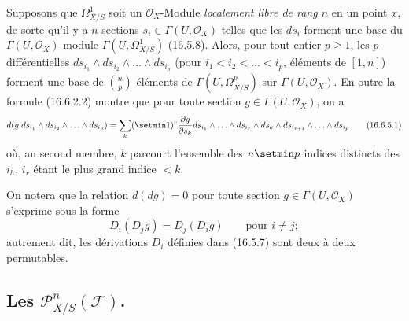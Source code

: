 \begin{env}[16.6.5]
\label{IV.16.6.5}
Supposons que $\boldsymbol{\varOmega}_{X/S}^1$ soit un $\mathcal{O}_X$-Module \emph{localement libre
de rang $n$} en un point $x$, de sorte qu'il y a $n$ sections
$s_i\in\Gamma(U,\mathcal{O}_X)$ telles que les $ds_i$ forment une base du
$\Gamma(U,\mathcal{O}_X)$-module $\Gamma(U,\varOmega_{X/S}^1)$ (16.5.8).
Alors, pour tout entier $p\geq1$, les $p$-différentielles
$ds_{i_1}\wedge ds_{i_2}\wedge\ldots\wedge ds_{i_p}$ (pour
$i_1<i_2<\ldots<i_p$, éléments de $[1,n]$) forment une base de
$\binom{n}{p}$ éléments de $\Gamma(U,\varOmega_{X/S}^p)$ sur
$\Gamma(U,\mathcal{O}_X)$. En outre la formule (16.6.2.2) montre que pour
toute section $g\in\Gamma(U,\mathcal{O}_X)$, on a
\[
  d(g.ds_{i_1}\wedge ds_{i_2}\wedge\ldots\wedge ds_{i_p})
  =\sum_k(\setmin 1)^r\frac{\partial g}{\partial s_k}
  ds_{i_1}\wedge\ldots\wedge ds_{i_r}\wedge ds_k\wedge
  ds_{i_{r+1}}\wedge\ldots\wedge ds_{i_p}
  \tag{16.6.5.1}
  \label{IV.16.6.5.1}
\]
où, au second membre, $k$ parcourt l'ensemble des $n\setmin p$ indices distincts des
$i_h$, $i_r$ étant le plus grand indice $<k$.

On notera que la relation $d(dg)=0$ pour toute section
$g\in\Gamma(U,\mathcal{O}_X)$ s'exprime sous la forme
\[
  D_i(D_jg)=D_j(D_ig)\qquad\text{pour $i\neq j$};
\]
autrement dit, les dérivations $D_i$ définies dans (16.5.7) sont deux à deux
permutables.
\end{env}

\subsection{\texorpdfstring{Les $\mathscr{P}_{X/S}^n(\mathscr{F})$.}{Les P\string_\string^n(F).}}

